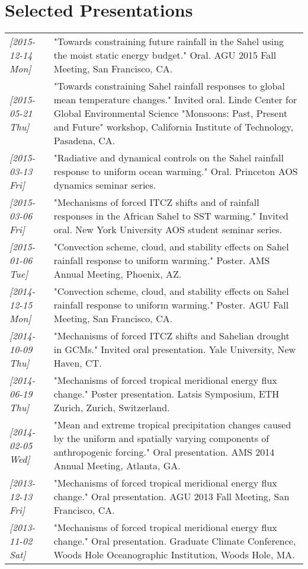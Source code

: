 \documentclass{article}
\begin{document}
\section*{Selected Presentations}
\label{sec:orgheadline17}
\begin{center}
\begin{tabularx}{\textwidth}{lX}
\textit{[2015-12-14 Mon]} & "Towards constraining future rainfall in the Sahel using the moist static energy budget." Oral.  AGU 2015 Fall Meeting, San Francisco, CA.\\
\textit{[2015-05-21 Thu]} & "Towards constraining Sahel rainfall responses to global mean temperature changes."  Invited oral.  Linde Center for Global Environmental Science "Monsoons: Past, Present and Future" workshop, California Institute of Technology, Pasadena, CA.\\
\textit{[2015-03-13 Fri]} & "Radiative and dynamical controls on the Sahel rainfall response to uniform ocean warming."  Oral.  Princeton AOS dynamics seminar series.\\
\textit{[2015-03-06 Fri]} & "Mechanisms of forced ITCZ shifts and of rainfall responses in the African Sahel to SST warming."  Invited oral.  New York University AOS student seminar series.\\
\textit{[2015-01-06 Tue]} & "Convection scheme, cloud, and stability effects on Sahel rainfall response to uniform warming."  Poster.  AMS Annual Meeting, Phoenix, AZ.\\
\textit{[2014-12-15 Mon]} & "Convection scheme, cloud, and stability effects on Sahel rainfall response to uniform warming."  Poster.  AGU Fall Meeting, San Francisco, CA.\\
\textit{[2014-10-09 Thu]} & "Mechanisms of forced ITCZ shifts and Sahelian drought in GCMs."  Invited oral presentation.  Yale University, New Haven, CT.\\
\textit{[2014-06-19 Thu]} & "Mechanisms of forced tropical meridional energy flux change."  Poster presentation.  Latsis Symposium, ETH Zurich, Zurich, Switzerland.\\
\textit{[2014-02-05 Wed]} & "Mean and extreme tropical precipitation changes caused by the uniform and spatially varying components of anthropogenic forcing."  Oral presentation.  AMS 2014 Annual Meeting, Atlanta, GA.\\
\textit{[2013-12-13 Fri]} & "Mechanisms of forced tropical meridional energy flux change."  Oral presentation.  AGU 2013 Fall Meeting, San Francisco, CA.\\
\textit{[2013-11-02 Sat]} & "Mechanisms of forced tropical meridional energy flux change."  Oral presentation.  Graduate Climate Conference, Woods Hole Oceanographic Institution, Woods Hole, MA.\\

\end{tabularx}
\end{center}
\end{document}
